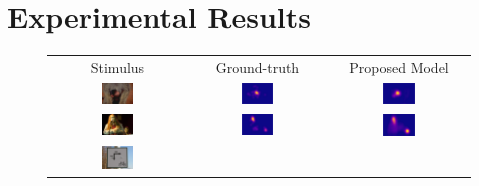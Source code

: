 \documentclass[10pt,twocolumn,letterpaper]{article}
\begin{document}
\section{Experimental Results}
\begin{figure}
\begin{center}
    \begin{tabular} {ccc}
    Stimulus & Ground-truth & Proposed Model\\
    \includegraphics[width=0.25\textwidth]{./img/monkey_s.jpg} &
    \includegraphics[width=0.25\textwidth]{./img/monkey_gt.jpg} &
    \includegraphics[width=0.25\textwidth]{./img/monkey_m.jpg}\\
    \includegraphics[width=0.25\textwidth]{./img/person_s.jpg} &
    \includegraphics[width=0.25\textwidth]{./img/person_gt.jpg} &
    \includegraphics[width=0.25\textwidth]{./img/person_m.jpg}\\
    \includegraphics[width=0.25\textwidth]{./img/sign_s.jpg} &

\end{tabular}
\end{center}
\end{figure}
\end{document}
